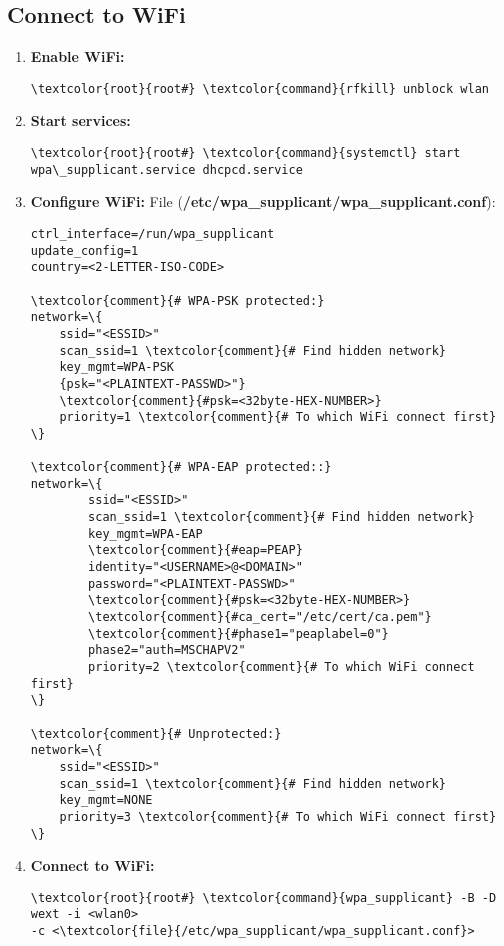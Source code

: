 \documentclass[10pt, a4paper, onecolumn, openany]{book} %
\begin{document}
\subsection{Connect to WiFi}
\begin{enumerate}
    \item \textbf{Enable WiFi:}
\begin{Verbatim}[commandchars=\\\{\}]
\textcolor{root}{root#} \textcolor{command}{rfkill} unblock wlan
\end{Verbatim}
    \item \textbf{Start services:}
\begin{Verbatim}[commandchars=\\\{\}]
\textcolor{root}{root#} \textcolor{command}{systemctl} start wpa\_supplicant.service dhcpcd.service
\end{Verbatim}
    \item \textbf{Configure WiFi:}
\newline File (\textbf{\textcolor{file}{/etc/wpa\_supplicant/wpa\_supplicant.conf}}):
\begin{Verbatim}[commandchars=\\\{\}]
ctrl_interface=/run/wpa_supplicant
update_config=1
country=<2-LETTER-ISO-CODE>

\textcolor{comment}{# WPA-PSK protected:}
network=\{
    ssid="<ESSID>"
    scan_ssid=1 \textcolor{comment}{# Find hidden network}
    key_mgmt=WPA-PSK
    {psk="<PLAINTEXT-PASSWD>"}
    \textcolor{comment}{#psk=<32byte-HEX-NUMBER>}
    priority=1 \textcolor{comment}{# To which WiFi connect first}
\}

\textcolor{comment}{# WPA-EAP protected::}
network=\{
        ssid="<ESSID>"
        scan_ssid=1 \textcolor{comment}{# Find hidden network}
        key_mgmt=WPA-EAP
        \textcolor{comment}{#eap=PEAP}
        identity="<USERNAME>@<DOMAIN>"
        password="<PLAINTEXT-PASSWD>"
        \textcolor{comment}{#psk=<32byte-HEX-NUMBER>}
        \textcolor{comment}{#ca_cert="/etc/cert/ca.pem"}
        \textcolor{comment}{#phase1="peaplabel=0"}
        phase2="auth=MSCHAPV2"
        priority=2 \textcolor{comment}{# To which WiFi connect first}
\}

\textcolor{comment}{# Unprotected:}
network=\{
    ssid="<ESSID>"
    scan_ssid=1 \textcolor{comment}{# Find hidden network}
    key_mgmt=NONE
    priority=3 \textcolor{comment}{# To which WiFi connect first}
\}    
\end{Verbatim}

    
    
    \item \textbf{Connect to WiFi:}
\begin{Verbatim}[commandchars=\\\{\}]
\textcolor{root}{root#} \textcolor{command}{wpa_supplicant} -B -D wext -i <wlan0> 
-c <\textcolor{file}{/etc/wpa_supplicant/wpa_supplicant.conf}>
\end{Verbatim}
\end{enumerate}
\end{document}
